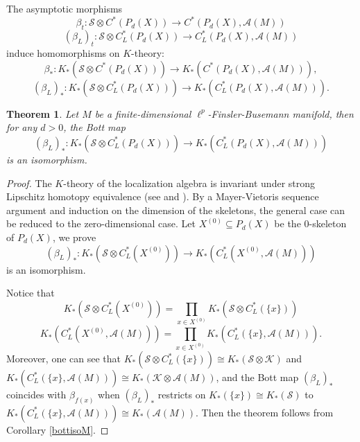 \documentclass{article}
\theoremstyle{plain}
\newtheorem{theorem}{Theorem}[section]
\theoremstyle{definition}
\theoremstyle{remark}
\def\A{\mathcal A}
\def\K{\mathcal K}
\def\S{\mathcal S}
\begin{document}
	The asymptotic morphisms
	$$\beta_t:\S\otimes C^*(P_d(X))\to C^*(P_d(X),\A(M))$$
	$$(\beta_L)_t:\S\otimes C^*_{L}(P_d(X))\to C^*_{L}(P_d(X),\A(M))$$
	induce homomorphisms on $K$-theory:
	$$\beta_*:K_*(\S\otimes C^*(P_d(X)))\to K_*(C^*(P_d(X),\A(M))),$$
	$$(\beta_L)_*:K_*(\S\otimes C^*_{L}(P_d(X)))\to K_*(C^*_{L}(P_d(X),\A(M))).$$
	\begin{theorem}\label{BottL}
		Let $M$ be a finite-dimensional $\ell^p$-Finsler-Busemann manifold, then for any $d> 0$, the Bott map
		$$(\beta_L)_*:K_*(\S\otimes C^*_{L}(P_d(X)))\to K_*(C^*_{L}(P_d(X),\A(M)))$$
		is an isomorphism.
	\end{theorem}
	\begin{proof}
		The $K$-theory of the localization algebra is invariant under strong Lipschitz homotopy equivalence (see \cite{yu1997localization} and \cite{yu2000coarse}). By a Mayer-Vietoris sequence argument and induction on the dimension of the skeletons, the general case can be reduced to the zero-dimensional case. Let $X^{(0)}\subseteq P_d(X)$ be the $0$-skeleton of $P_d(X)$, we prove
		$$(\beta_L)_*:K_*\left(\S\otimes C^*_{L}\left(X^{(0)}\right)\right)\to K_*\left(C^*_{L}\left(X^{(0)},\A(M)\right)\right)$$
		is an isomorphism.
		
		Notice that
		$$K_*\left(\S\otimes C^*_{L}\left(X^{(0)}\right)\right)=\prod_{x\in X^{(0)}}K_*(\S\otimes C^*_L(\{x\}))$$
		$$K_*\left(C^*_{L}\left( X^{(0)},\A(M)\right)\right)=\prod_{x\in X^{(0)}}K_*(C^*_L(\{x\},\A(M))).$$
		Moreover, one can see that $K_*(\S\otimes C^*_L(\{x\}))\cong K_*(\S\otimes\K)$ and $K_*(C^*_L(\{x\},\A(M)))\cong K_*(\K\otimes\A(M))$, and the Bott map $(\beta_L)_*$ coincides with $\beta_{f(x)}$ when $(\beta_L)_*$ restricts on $K_*(\{x\})\cong K_*(\S)$ to $K_*(C^*_L(\{x\},\A(M)))\cong K_*(\A(M))$. Then the theorem follows from Corollary \ref{bottisoM}.
	\end{proof}
	
\end{document}
